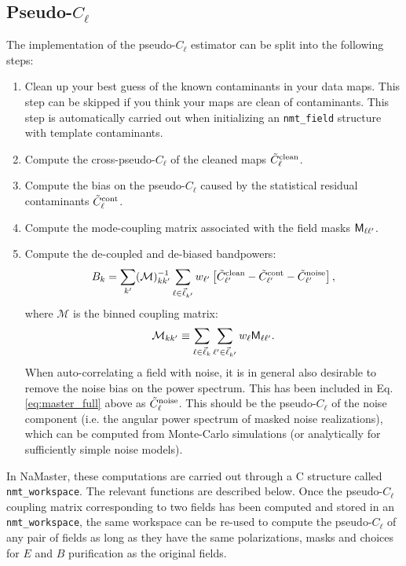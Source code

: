 \documentclass[a4paper,10pt]{article}
\begin{document}
\subsection{Pseudo-$C_\ell$}
The implementation of the pseudo-$C_\ell$ estimator can be split into the following steps:
\begin{enumerate}
  \item Clean up your best guess of the known contaminants in your data maps. This step can be skipped if you think your maps are clean of contaminants. This step is automatically carried out when initializing an {\tt nmt\_field} structure with template contaminants.
  \item Compute the cross-pseudo-$C_\ell$ of the cleaned maps $\tilde{C}^{\rm clean}_\ell$.
  \item Compute the bias on the pseudo-$C_\ell$ caused by the statistical residual contaminants $\tilde{C}^{\rm cont}_\ell$.
  \item Compute the mode-coupling matrix associated with the field masks ${\sf M}_{\ell\ell'}$.
  \item Compute the de-coupled and de-biased bandpowers:
        \begin{equation}\label{eq:master_full}
          B_k=\sum_{k'}(\mathcal{M})^{-1}_{kk'}\sum_{\ell\in\vec{\ell}_{k'}}w_{\ell'}\left[\tilde{C}^{\rm clean}_{\ell'}-\tilde{C}^{\rm cont}_{\ell'}-\tilde{C}^{\rm noise}_{\ell'}\right],
        \end{equation}
        where $\mathcal{M}$ is the binned coupling matrix:
        \begin{equation}
          \mathcal{M}_{kk'}\equiv\sum_{\ell\in\vec{\ell}_k}\sum_{\ell'\in\vec{\ell}_{k'}}w_\ell{\sf M}_{\ell\ell'}.
        \end{equation}
        When auto-correlating a field with noise, it is in general also desirable to remove the noise bias on the power spectrum. This has been included in Eq. \ref{eq:master_full} above as $\tilde{C}^{\rm noise}_\ell$. This should be the pseudo-$C_\ell$ of the noise component (i.e. the angular power spectrum of masked noise realizations), which can be computed from Monte-Carlo simulations (or analytically for sufficiently simple noise models).
\end{enumerate}
In NaMaster, these computations are carried out through a C structure called {\tt nmt\_workspace}. The relevant functions are described below. Once the pseudo-$C_\ell$ coupling matrix corresponding to two fields has been computed and stored in an {\tt nmt\_workspace}, the same workspace can be re-used to compute the pseudo-$C_\ell$ of any pair of fields as long as they have the same polarizations, masks and choices for $E$ and $B$ purification as the original fields.
\end{document}
